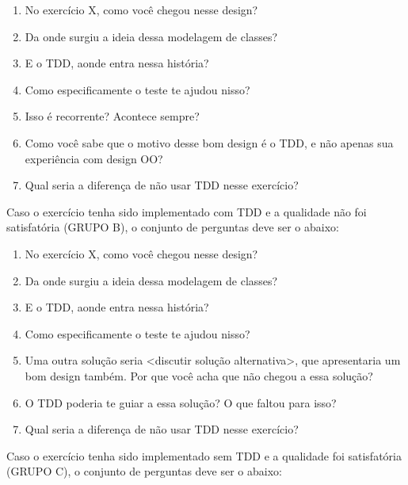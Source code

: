 \begin{enumerate}
	
	\item No exercício X, como você chegou nesse design?
	
	\item Da onde surgiu a ideia dessa modelagem de classes?
	
	\item E o TDD, aonde entra nessa história?
	
	\item Como especificamente o teste te ajudou nisso?
	
	\item Isso é recorrente? Acontece sempre?
	
	\item Como você sabe que o motivo desse bom design é o TDD, e não apenas sua experiência
	com design OO?
	
	\item Qual seria a diferença de não usar TDD nesse exercício?
\end{enumerate}

Caso o exercício tenha sido implementado com TDD e a qualidade não foi satisfatória (GRUPO B),
o conjunto de perguntas deve ser o abaixo:

\begin{enumerate}
	
	\item No exercício X, como você chegou nesse design?
	
	\item Da onde surgiu a ideia dessa modelagem de classes?
	
	\item E o TDD, aonde entra nessa história?
	
	\item Como especificamente o teste te ajudou nisso?
	
	\item Uma outra solução seria <discutir solução alternativa>, que apresentaria um bom design também. Por que você
	acha que não chegou a essa solução?
	
	\item O TDD poderia te guiar a essa solução? O que faltou para isso?
	
	\item Qual seria a diferença de não usar TDD nesse exercício?

\end{enumerate}

Caso o exercício tenha sido implementado sem TDD e a qualidade foi satisfatória (GRUPO C),
o conjunto de perguntas deve ser o abaixo:

